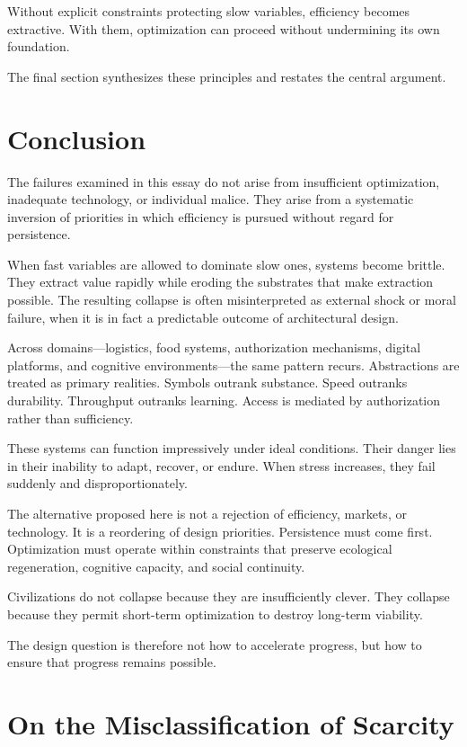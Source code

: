 \documentclass[12pt]{article} \usepackage[margin=1in]{geometry} \usepackage{setspace} \usepackage{amsmath,amssymb} \usepackage{hyperref}
\begin{document}
Without explicit constraints protecting slow variables, efficiency becomes extractive. With them, optimization can proceed without undermining its own foundation.

The final section synthesizes these principles and restates the central argument.

\section{Conclusion}

The failures examined in this essay do not arise from insufficient optimization, inadequate technology, or individual malice. They arise from a systematic inversion of priorities in which efficiency is pursued without regard for persistence.

When fast variables are allowed to dominate slow ones, systems become brittle. They extract value rapidly while eroding the substrates that make extraction possible. The resulting collapse is often misinterpreted as external shock or moral failure, when it is in fact a predictable outcome of architectural design.

Across domains—logistics, food systems, authorization mechanisms, digital platforms, and cognitive environments—the same pattern recurs. Abstractions are treated as primary realities. Symbols outrank substance. Speed outranks durability. Throughput outranks learning. Access is mediated by authorization rather than sufficiency.

These systems can function impressively under ideal conditions. Their danger lies in their inability to adapt, recover, or endure. When stress increases, they fail suddenly and disproportionately.

The alternative proposed here is not a rejection of efficiency, markets, or technology. It is a reordering of design priorities. Persistence must come first. Optimization must operate within constraints that preserve ecological regeneration, cognitive capacity, and social continuity.

Civilizations do not collapse because they are insufficiently clever. They collapse because they permit short-term optimization to destroy long-term viability.

The design question is therefore not how to accelerate progress, but how to ensure that progress remains possible.

\newpage
\appendix

\section{On the Misclassification of Scarcity}
\end{document}
